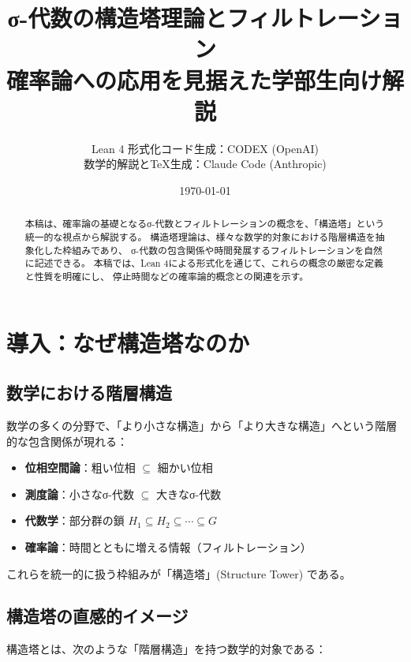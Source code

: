 \documentclass[a4paper,12pt]{ltjsarticle}
\title{σ-代数の構造塔理論とフィルトレーション\\
{\large 確率論への応用を見据えた学部生向け解説}}
\author{
  Lean 4 形式化コード生成：CODEX (OpenAI)\\
  数学的解説とTeX生成：Claude Code (Anthropic)
}
\date{\today}
\theoremstyle{definition}
\begin{document}
\maketitle

\begin{abstract}
本稿は、確率論の基礎となるσ-代数とフィルトレーションの概念を、「構造塔」という統一的な視点から解説する。
構造塔理論は、様々な数学的対象における階層構造を抽象化した枠組みであり、
σ-代数の包含関係や時間発展するフィルトレーションを自然に記述できる。
本稿では、Lean 4による形式化を通じて、これらの概念の厳密な定義と性質を明確にし、
停止時間などの確率論的概念との関連を示す。
\end{abstract}

\tableofcontents

\section{導入：なぜ構造塔なのか}

\subsection{数学における階層構造}

\begin{motivation}
数学の多くの分野で、「より小さな構造」から「より大きな構造」へという階層的な包含関係が現れる：
\begin{itemize}
  \item \textbf{位相空間論}：粗い位相 $\subseteq$ 細かい位相
  \item \textbf{測度論}：小さなσ-代数 $\subseteq$ 大きなσ-代数
  \item \textbf{代数学}：部分群の鎖 $H_1 \subseteq H_2 \subseteq \cdots \subseteq G$
  \item \textbf{確率論}：時間とともに増える情報（フィルトレーション）
\end{itemize}
これらを統一的に扱う枠組みが「構造塔」(Structure Tower) である。
\end{motivation}

\subsection{構造塔の直感的イメージ}

構造塔とは、次のような「階層構造」を持つ数学的対象である：
\end{document}

